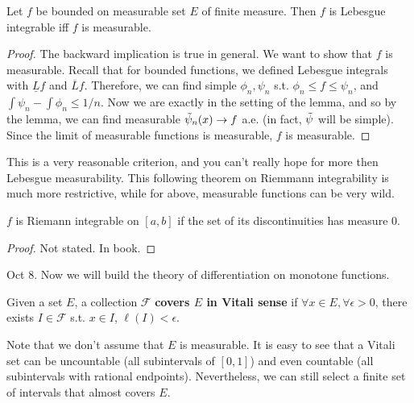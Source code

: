   \begin{theorem}
    Let $f$ be bounded on measurable set $E$ of finite measure. Then $f$ is Lebesgue integrable iff $f$ is measurable. 
  \end{theorem}
  \begin{proof}
    The backward implication is true in general. We want to show that $f$ is measurable. Recall that for bounded functions, we defined Lebesgue integrals with $\underline{L}f$ and $\overline{L}f$. Therefore, we can find simple $\phi_n, \psi_n$ s.t. $\phi_n \leq f \leq \psi_n$, and $\int \psi_n - \int \phi_n \leq 1/n$. Now we are exactly in the setting of the lemma, and so by the lemma, we can find measurable $\Tilde{\psi}_n (x) \to f$ a.e. (in fact, $\Tilde{\psi}$ will be simple). Since the limit of measurable functions is measurable, $f$ is measurable.
  \end{proof}

  This is a very reasonable criterion, and you can't really hope for more then Lebesgue measurability. This following theorem on Riemmann integrability is much more restrictive, while for above, measurable functions can be very wild. 

  \begin{theorem}
    $f$ is Riemann integrable on $[a, b]$ if the set of its discontinuities has measure $0$. 
  \end{theorem}
  \begin{proof}
    Not stated. In book. 
  \end{proof}


  Oct 8. Now we will build the theory of differentiation on monotone functions. 

  \begin{definition}[]
    Given a set $E$, a collection $\mathcal{F}$ \textbf{covers $E$ in Vitali sense} if $\forall x \in E, \forall \epsilon > 0$, there exists $I \in \mathcal{F}$ s.t. $x \in I$, $\ell(I) < \epsilon$. 
  \end{definition}

  Note that we don't assume that $E$ is measurable. It is easy to see that a Vitali set can be uncountable (all subintervals of $[0, 1]$) and even countable (all subintervals with rational endpoints). Nevertheless, we can still select a finite set of intervals that almost covers $E$. 

